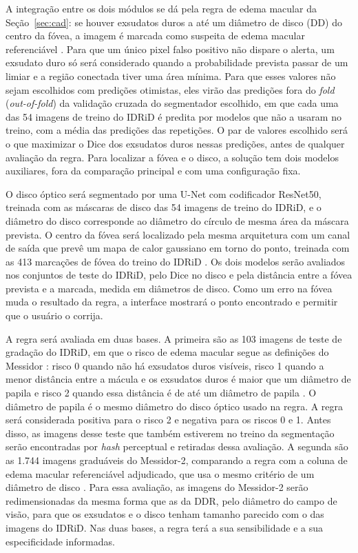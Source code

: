 A integração entre os dois módulos se dá pela regra de edema macular da Seção~\ref{sec:cad}: se houver exsudatos duros a até um diâmetro de disco (DD) do centro da fóvea, a imagem é marcada como suspeita de edema macular referenciável \cite{krause2018grader}. Para que um único pixel falso positivo não dispare o alerta, um exsudato duro só será considerado quando a probabilidade prevista passar de um limiar e a região conectada tiver uma área mínima. Para que esses valores não sejam escolhidos com predições otimistas, eles virão das predições fora do \textit{fold} (\textit{out-of-fold}) da validação cruzada do segmentador escolhido, em que cada uma das 54 imagens de treino do IDRiD é predita por modelos que não a usaram no treino, com a média das predições das repetições. O par de valores escolhido será o que maximizar o Dice dos exsudatos duros nessas predições, antes de qualquer avaliação da regra. Para localizar a fóvea e o disco, a solução tem dois modelos auxiliares, fora da comparação principal e com uma configuração fixa.

O disco óptico será segmentado por uma U-Net com codificador ResNet50, treinada com as máscaras de disco das 54 imagens de treino do IDRiD, e o diâmetro do disco corresponde ao diâmetro do círculo de mesma área da máscara prevista. O centro da fóvea será localizado pela mesma arquitetura com um canal de saída que prevê um mapa de calor gaussiano em torno do ponto, treinada com as 413 marcações de fóvea do treino do IDRiD \cite{porwal2018idrid}. Os dois modelos serão avaliados nos conjuntos de teste do IDRiD, pelo Dice no disco e pela distância entre a fóvea prevista e a marcada, medida em diâmetros de disco. Como um erro na fóvea muda o resultado da regra, a interface mostrará o ponto encontrado e permitir que o usuário o corrija.

A regra será avaliada em duas bases. A primeira são as 103 imagens de teste de gradação do IDRiD, em que o risco de edema macular segue as definições do Messidor \cite{porwal2018idrid}: risco 0 quando não há exsudatos duros visíveis, risco 1 quando a menor distância entre a mácula e os exsudatos duros é maior que um diâmetro de papila e risco 2 quando essa distância é de até um diâmetro de papila \cite{adcis2008messidor}. O diâmetro de papila é o mesmo diâmetro do disco óptico usado na regra. A regra será considerada positiva para o risco 2 e negativa para os riscos 0 e 1. Antes disso, as imagens desse teste que também estiverem no treino da segmentação serão encontradas por \textit{hash} perceptual e retiradas dessa avaliação. A segunda são as 1.744 imagens graduáveis do Messidor-2, comparando a regra com a coluna de edema macular referenciável adjudicado, que usa o mesmo critério de um diâmetro de disco \cite{googlebrain2018messidor2}. Para essa avaliação, as imagens do Messidor-2 serão redimensionadas da mesma forma que as da DDR, pelo diâmetro do campo de visão, para que os exsudatos e o disco tenham tamanho parecido com o das imagens do IDRiD. Nas duas bases, a regra terá a sua sensibilidade e a sua especificidade informadas.

